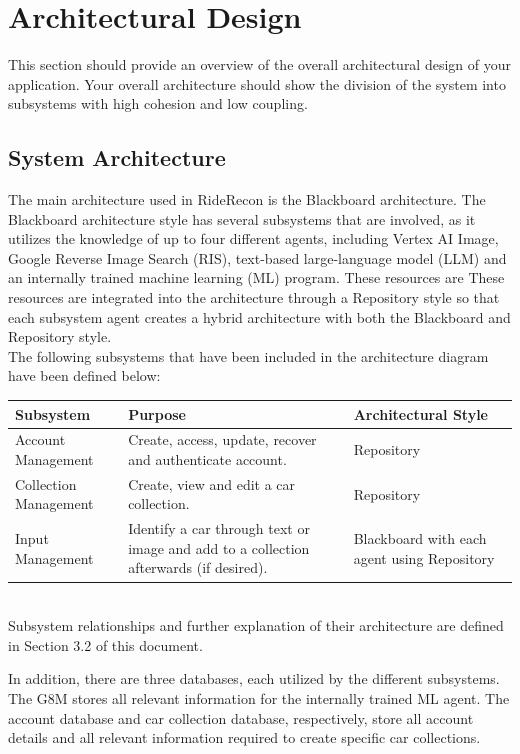 \documentclass[]{article}
\begin{document}
\section{Architectural Design}
\label{sec:architectural_design}
This section should provide an overview of the overall architectural design of your application. Your overall architecture should show the division of the system into subsystems with high cohesion and low coupling.

\subsection{System Architecture}
\label{sub:system_architecture}
The main architecture used in RideRecon is the Blackboard architecture. The Blackboard architecture style has several subsystems that are involved, as it utilizes the knowledge of up to four different agents, including Vertex AI Image, Google Reverse Image Search (RIS), text-based large-language model (LLM) and an internally trained machine learning (ML) program. These resources are These resources are integrated into the architecture through a Repository style so that each subsystem agent creates a hybrid architecture with both the Blackboard and Repository style.\\

\noindent The following subsystems that have been included in the architecture diagram have been defined below:\\

\noindent
\begin{tabular}{|p{4cm}|p{7cm}|p{3.5cm}|}
	\hline
	Subsystem & Purpose & Architectural Style \\
	\hline
	Account Management & Create, access, update, recover and authenticate account. & Repository \\
	\hline
	Collection Management & Create, view and edit a car collection. & Repository \\
	\hline
	Input Management & Identify a car through text or image and add to a collection afterwards (if desired). & Blackboard with each agent using Repository \\
	\hline
\end{tabular}\\


\noindent Subsystem relationships and further explanation of their architecture are defined in Section 3.2 of this document.

\noindent In addition, there are three databases, each utilized by the different subsystems. The G8M stores all relevant information for the internally trained ML agent. The account database and car collection database, respectively, store all account details and all relevant information required to create specific car collections.\\
\end{document}
